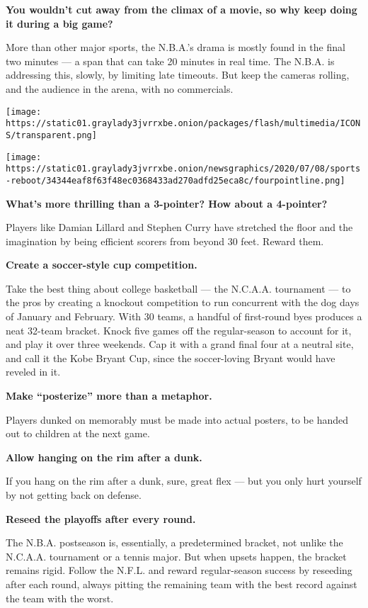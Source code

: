 \textbf{You wouldn't cut away from the climax of a movie, so why keep
doing it during a big game?}

More than other major sports, the N.B.A.'s drama is mostly found in the
final two minutes --- a span that can take 20 minutes in real time. The
N.B.A. is addressing this, slowly, by limiting late timeouts. But keep
the cameras rolling, and the audience in the arena, with no commercials.

\texttt{[image: https://static01.graylady3jvrrxbe.onion/packages/flash/multimedia/ICONS/transparent.png]}

\texttt{[image: https://static01.graylady3jvrrxbe.onion/newsgraphics/2020/07/08/sports-reboot/34344eaf8f63f48ec0368433ad270adfd25eca8c/fourpointline.png]}

\textbf{What's more thrilling than a 3-pointer? How about a 4-pointer?}

Players like Damian Lillard and Stephen Curry have stretched the floor
and the imagination by being efficient scorers from beyond 30 feet.
Reward them.

\textbf{Create a soccer-style cup competition.}

Take the best thing about college basketball --- the N.C.A.A. tournament
--- to the pros by creating a knockout competition to run concurrent
with the dog days of January and February. With 30 teams, a handful of
first-round byes produces a neat 32-team bracket. Knock five games off
the regular-season to account for it, and play it over three weekends.
Cap it with a grand final four at a neutral site, and call it the Kobe
Bryant Cup, since the soccer-loving Bryant would have reveled in it.

\textbf{Make ``posterize'' more than a metaphor.}

Players dunked on memorably must be made into actual posters, to be
handed out to children at the next game.

\textbf{Allow hanging on the rim after a dunk.}

If you hang on the rim after a dunk, sure, great flex --- but you only
hurt yourself by not getting back on defense.

\textbf{Reseed the playoffs after every round.}

The N.B.A. postseason is, essentially, a predetermined bracket, not
unlike the N.C.A.A. tournament or a tennis major. But when upsets
happen, the bracket remains rigid. Follow the N.F.L. and reward
regular-season success by reseeding after each round, always pitting the
remaining team with the best record against the team with the worst.

